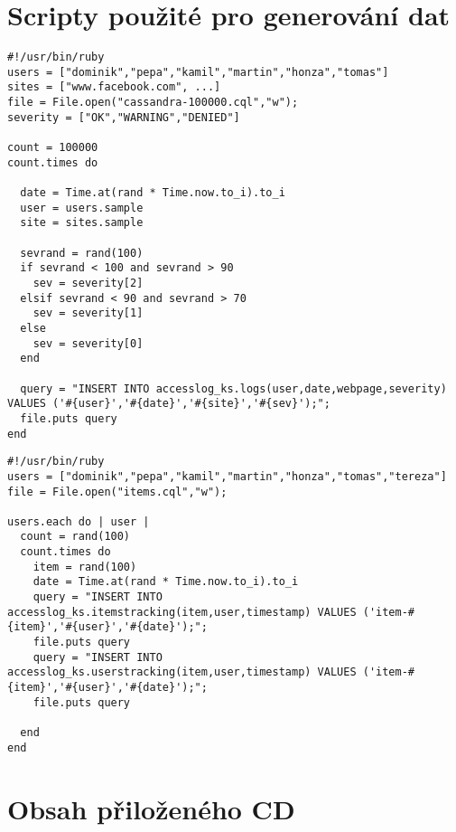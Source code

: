 \documentclass[thesis=M,czech]{FITthesis}[2012/06/26]
\begin{document}
\chapter{Scripty použité pro generování dat}
\lstset{language=Ruby}          %
\begin{lstlisting}[caption={Generování přístupů z~Access Logů},label=CQL3]
#!/usr/bin/ruby
users = ["dominik","pepa","kamil","martin","honza","tomas"]
sites = ["www.facebook.com", ...]
file = File.open("cassandra-100000.cql","w");
severity = ["OK","WARNING","DENIED"]

count = 100000
count.times do
  
  date = Time.at(rand * Time.now.to_i).to_i
  user = users.sample
  site = sites.sample
  
  sevrand = rand(100)
  if sevrand < 100 and sevrand > 90
    sev = severity[2]
  elsif sevrand < 90 and sevrand > 70
    sev = severity[1]
  else
    sev = severity[0]
  end
  
  query = "INSERT INTO accesslog_ks.logs(user,date,webpage,severity) VALUES ('#{user}','#{date}','#{site}','#{sev}');";
  file.puts query   
end
\end{lstlisting}
\pagebreak
\begin{lstlisting}[caption={Generování transakčních událostí},label=CQL3]
#!/usr/bin/ruby
users = ["dominik","pepa","kamil","martin","honza","tomas","tereza"]
file = File.open("items.cql","w");

users.each do | user |
  count = rand(100)
  count.times do
    item = rand(100)
    date = Time.at(rand * Time.now.to_i).to_i
    query = "INSERT INTO accesslog_ks.itemstracking(item,user,timestamp) VALUES ('item-#{item}','#{user}','#{date}');";
    file.puts query       
    query = "INSERT INTO accesslog_ks.userstracking(item,user,timestamp) VALUES ('item-#{item}','#{user}','#{date}');";
    file.puts query    
  
  end
end 
\end{lstlisting}

\chapter{Obsah přiloženého CD}


\begin{figure}
\end{figure}
\end{document}
